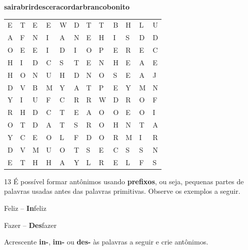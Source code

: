 \begin{myquote}
\textbf{sair}\hfill \textbf{abrir}\hfill \textbf{descer}\hfill \textbf{acordar}\hfill \textbf{branco}\hfill \textbf{bonito}\hfill
\end{myquote}

\begin{center}
\begin{tabular}{llllllllllll}
E & T & E & E & W & D & T & T & B & H & L & U\\

A & F & N & I & A & N & E & H & I & S & D & D\\

O & E & E & I & D & I & O & P & E & R & E & C\\

H & I & D & C & S & T & E & N & H & E & A & E\\

H & O & N & U & H & D & N & O & S & E & A & J\\

D & V & B & M & Y & A & T & P & E & Y & M & N\\

Y & I & U & F & C & R & R & W & D & R & O & F\\

R & H & D & C & T & E & A & O & O & E & O & I\\

O & T & D & A & T & S & R & O & H & N & T & A\\

Y & C & E & O & L & F & D & O & R & M & I & R\\

D & V & M & U & O & T & S & E & C & S & S & N\\

E & T & H & H & A & Y & L & R & E & L & F & S
\end{tabular}
\end{center}

\num{13} É possível formar antônimos usando \textbf{prefixos}, ou seja, pequenas
partes de palavras usadas antes das palavras primitivas. Observe os exemplos a seguir.

\begin{myquote}
\centering
Feliz -- \textbf{In}feliz

Fazer -- \textbf{Des}fazer
\end{myquote}

Acrescente \textbf{in-}, \textbf{im-} ou \textbf{des-} às palavras a seguir e crie antônimos.

